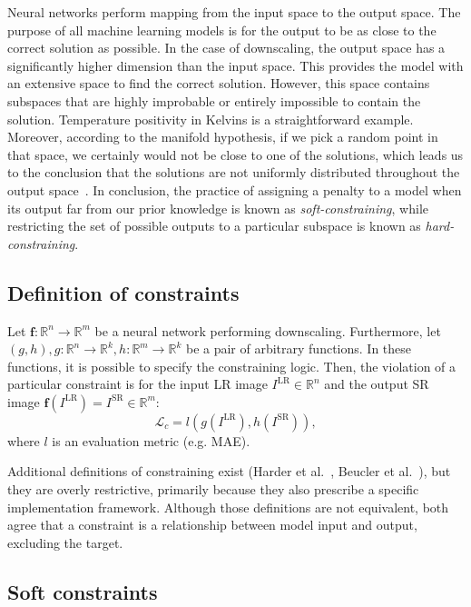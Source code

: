 Neural networks perform mapping from the input space to the output space.
The purpose of all machine learning models is for the output to be as close to the correct solution as possible.
In the case of downscaling, the output space has a significantly higher dimension than the input space.
This provides the model with an extensive space to find the correct solution.
However, this space contains subspaces that are highly improbable or entirely impossible to contain the solution.
Temperature positivity in Kelvins is a straightforward example.
Moreover, according to the manifold hypothesis, if we pick a random point in that space, we certainly would not be close to one of the solutions, which leads us to the conclusion that the solutions are not uniformly distributed throughout the output space~\cite{Goodfellow2016}.
In conclusion, the practice of assigning a penalty to a model when its output far from our prior knowledge is known as \textit{soft-constraining}, while restricting the set of possible outputs to a particular subspace is known as \textit{hard-constraining}.

\subsection{Definition of constraints}
\label{ss:constraining}
Let $\mathbf{f}\colon \mathbb{R}^n \to \mathbb{R}^m$ be a neural network performing downscaling.
Furthermore, let $(g,h), g\colon\mathbb{R}^n \to \mathbb{R}^k, h\colon \mathbb{R}^m \to \mathbb{R}^k$ be a pair of arbitrary functions.
In these functions, it is possible to specify the constraining logic.
Then, the violation of a particular constraint is for the input LR image $I^{\text{LR}} \in \mathbb{R}^n$ and the output SR image $\mathbf{f}\left(I^{\text{LR}}\right) = I^{\text{SR}} \in \mathbb{R}^m$:
\begin{equation}
    \mathcal{L}_c = l\left(g\left(I^{\text{LR}}\right), h\left(I^{\text{SR}}\right)\right),
    \label{e:constraint}
\end{equation}
where $l$ is an evaluation metric (e.g. MAE). 

Additional definitions of constraining exist (Harder et al.~\cite{Harder2023}, Beucler et al.~\cite{Beucler2021}), but they are overly restrictive, primarily because they also prescribe a specific implementation framework.
Although those definitions are not equivalent, both agree that a constraint is a relationship between model input and output, excluding the target.

\subsection{Soft constraints}
\label{ss:soft}

